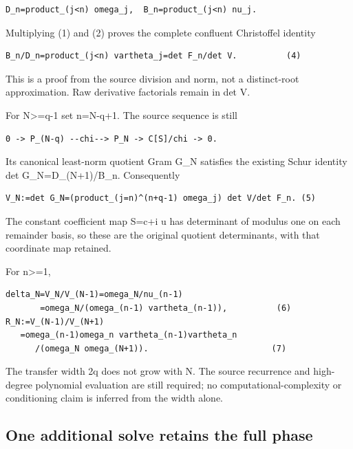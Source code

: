\begin{Verbatim}[breaklines=true,breakanywhere=true,fontsize=\small]
D_n=product_(j<n) omega_j,  B_n=product_(j<n) nu_j.
\end{Verbatim}

Multiplying (1) and (2) proves the complete confluent Christoffel
identity

\begin{Verbatim}[breaklines=true,breakanywhere=true,fontsize=\small]
B_n/D_n=product_(j<n) vartheta_j=det F_n/det V.          (4)
\end{Verbatim}

This is a proof from the source division and norm, not a distinct-root
approximation. Raw derivative factorials remain in det V.

For N\textgreater=q-1 set n=N-q+1. The source sequence is still

\begin{Verbatim}[breaklines=true,breakanywhere=true,fontsize=\small]
0 -> P_(N-q) --chi--> P_N -> C[S]/chi -> 0.
\end{Verbatim}

Its canonical least-norm quotient Gram G\_N satisfies the existing Schur
identity det G\_N=D\_(N+1)/B\_n. Consequently

\begin{Verbatim}[breaklines=true,breakanywhere=true,fontsize=\small]
V_N:=det G_N=(product_(j=n)^(n+q-1) omega_j) det V/det F_n. (5)
\end{Verbatim}

The constant coefficient map S=c+i u has determinant of modulus one on
each remainder basis, so these are the original quotient determinants,
with that coordinate map retained.

For n\textgreater=1,

\begin{Verbatim}[breaklines=true,breakanywhere=true,fontsize=\small]
delta_N=V_N/V_(N-1)=omega_N/nu_(n-1)
       =omega_N/(omega_(n-1) vartheta_(n-1)),          (6)
R_N:=V_(N-1)/V_(N+1)
   =omega_(n-1)omega_n vartheta_(n-1)vartheta_n
      /(omega_N omega_(N+1)).                         (7)
\end{Verbatim}

The transfer width 2q does not grow with N. The source recurrence and
high-degree polynomial evaluation are still required; no
computational-complexity or conditioning claim is inferred from the
width alone.

\subsection[\hspace{0.4em}One additional solve retains the full
phase]{One additional solve retains the full
phase}\label{confluent-transfer-one-additional-solve-retains-the-full-phase}

